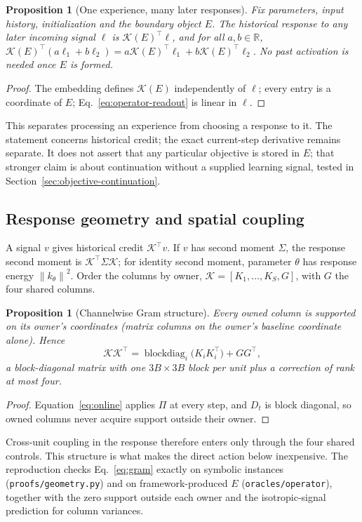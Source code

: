 \documentclass[11pt]{article}
\newtheorem{proposition}[theorem]{Proposition}
\theoremstyle{definition}
\newcommand{\R}{\mathbb R}
\newcommand{\bdiag}{\operatorname{blockdiag}}
\newcommand{\norm}[1]{\left\lVert #1\right\rVert}
\begin{document}
\begin{proposition}[One experience, many later responses]
\label{prop:late-signals}
Fix parameters, input history, initialization and the boundary object $E$. The
historical response to any later incoming signal $\ell$ is $\mathcal K(E)^\top\ell$,
and for all $a,b\in\R$,
$\mathcal K(E)^\top(a\ell_1+b\ell_2)=a\mathcal K(E)^\top\ell_1+b\mathcal K(E)^\top\ell_2$.
No past activation is needed once $E$ is formed.
\end{proposition}
\begin{proof}
The embedding defines $\mathcal K(E)$ independently of $\ell$; every entry is a
coordinate of $E$; Eq.~\eqref{eq:operator-readout} is linear in $\ell$.
\end{proof}
This separates processing an experience from choosing a response to it. The
statement concerns historical credit; the exact current-step derivative remains
separate. It does not assert that any particular objective is stored in $E$;
that stronger claim is about continuation without a supplied learning signal,
tested in Section~\ref{sec:objective-continuation}.

\subsection{Response geometry and spatial coupling}
\label{sec:geometry}

A signal $v$ gives historical credit $\mathcal K^\top v$. If $v$ has second moment
$\Sigma$, the response second moment is $\mathcal K^\top\Sigma\mathcal K$; for
identity second moment, parameter $\theta$ has response energy $\norm{k_\theta}^2$.
Order the columns by owner, $\mathcal K=[K_1,\ldots,K_S,G]$, with $G$ the four
shared columns.

\begin{proposition}[Channelwise Gram structure]
\label{prop:gram}
Every owned column is supported on its owner's coordinates (matrix columns on the
owner's baseline coordinate alone). Hence
\begin{equation}
 \mathcal K\mathcal K^\top=\bdiag_i\big(K_iK_i^\top\big)+GG^\top,
 \label{eq:gram}
\end{equation}
a block-diagonal matrix with one $3B\times3B$ block per unit plus a correction of
rank at most four.
\end{proposition}
\begin{proof}
Equation~\eqref{eq:online} applies $\Pi$ at every step, and $D_t$ is block diagonal,
so owned columns never acquire support outside their owner.
\end{proof}
Cross-unit coupling in the response therefore enters only through the four shared
controls. This structure is what makes the direct action below inexpensive. The
reproduction checks Eq.~\eqref{eq:gram} exactly on symbolic instances
(\texttt{proofs/geometry.py}) and on framework-produced $E$
(\texttt{oracles/operator}), together with the zero support outside each owner and
the isotropic-signal prediction for column variances.
\end{document}
